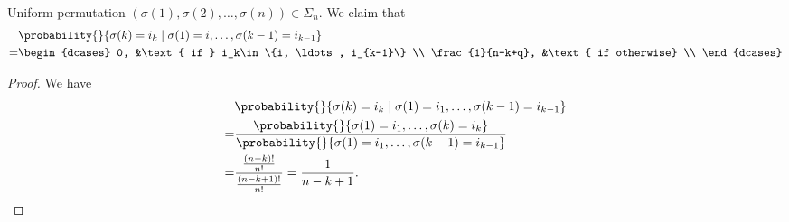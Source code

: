 \begin{example}
    Uniform permutation \((\sigma(1),\sigma(2), \ldots , \sigma(n)) \in \Sigma_n\). We claim that
    \begin{align*}
        &\probability{}{\sigma(k) = i_k \mid \sigma(1) = i, \ldots, \sigma(k - 1) = i_{k-1}}\\
        =& \begin{dcases}
            0, &\text{ if } i_k\in \{i, \ldots, i_{k-1}\} \\
            \frac{1}{n-k+q}, &\text{ if otherwise} \\
        \end{dcases}
    \end{align*}
    \begin{proof}
    We have
    \begin{align*}
        &\probability{}{\sigma(k) = i_k \mid \sigma(1) = i_1, \ldots, \sigma(k - 1) = i_{k-1}}\\
        =& \frac{\probability{}{\sigma(1)=i_1, \ldots, \sigma(k) = i_k}}{\probability{}{\sigma(1)=i_1,\ldots, \sigma(k-1) = i_{k-1}} }\\
        =& \frac{\frac{(n - k)!}{n!}}{\frac{(n-k+1)!}{n!}} = \frac{1}{n -k +1}.
    \end{align*}
    \end{proof}
\end{example}
